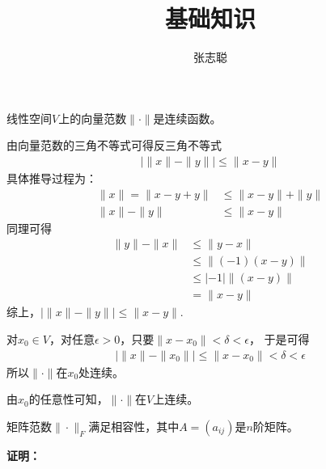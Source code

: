 \documentclass{article}
\begin{document}
\title{基础知识}
\author{张志聪}
\maketitle

\begin{zremark}
  线性空间$V$上的向量范数$\| \cdot \|$是连续函数。
\end{zremark}

由向量范数的三角不等式可得反三角不等式
\begin{align*}
  \big| \|x\| - \|y\| \big| \leq \| x - y \|
\end{align*}
具体推导过程为：
\begin{align*}
  \| x \| = \| x - y + y\| & \leq \| x - y \| + \| y \| \\
  \| x \| - \| y \|        & \leq \| x - y \|
\end{align*}
同理可得
\begin{align*}
  \| y \| - \| x \| & \leq \| y - x \|        \\
                    & \leq \| (-1) (x - y) \| \\
                    & \leq |- 1|\| (x - y) \| \\
                    & = \| x - y \|
\end{align*}
综上，$\big| \|x\| - \|y\| \big| \leq \| x - y \|$.

对$x_0 \in V$，对任意$\epsilon > 0$，只要$\|x - x_0\| < \delta < \epsilon$，
于是可得
\begin{align*}
  \big| \|x\| - \|x_0\| \big| \leq \| x - x_0 \| < \delta < \epsilon
\end{align*}
所以$\|\cdot\|$在$x_0$处连续。

由$x_0$的任意性可知，$\|\cdot\|$在$V$上连续。

\begin{zremark}
  矩阵范数$\|\cdot\|_F$满足相容性，其中$A = (a_{ij})$是$n$阶矩阵。
\end{zremark}

\textbf{证明：}
\end{document}
